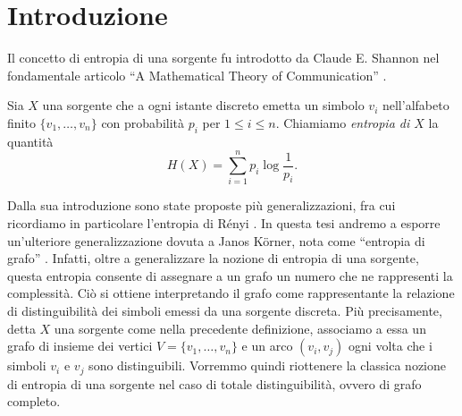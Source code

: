 \chapter{Introduzione} 
Il concetto di entropia di una sorgente fu introdotto da Claude E. Shannon nel fondamentale articolo ``A Mathematical Theory of Communication'' \cite{Shannon1948}.
\begin{definition}
  Sia \(X\) una sorgente che a ogni istante discreto emetta un simbolo \(v_i\) nell'alfabeto finito \(\{v_1,\dots,v_n\}\) con probabilità \(p_i\) per \(1\le i\le n\). Chiamiamo \emph{entropia di \(X\)} la quantità
  \[H(X)=\sum_{i=1}^n{p_i\log{\frac{1}{p_i}}}\text{.}\]
\end{definition}

Dalla sua introduzione sono state proposte più generalizzazioni, fra cui 
ricordiamo in particolare l'entropia di Rényi \cite{Renyi1961}. In questa tesi 
andremo a esporre un'ulteriore generalizzazione dovuta a Janos K\"orner, nota 
come ``entropia di grafo'' \cite{Korner1973}. Infatti, oltre a generalizzare 
la nozione di entropia di una sorgente, questa entropia consente di assegnare 
a un grafo un numero che ne rappresenti la complessità. Ciò si ottiene 
interpretando il grafo come rappresentante la relazione di distinguibilità dei 
simboli emessi da una sorgente discreta. Più precisamente, detta \(X\) una 
sorgente come nella precedente definizione, associamo a essa un grafo di 
insieme dei vertici \(V=\{v_1,\dots,v_n\}\) e un arco \((v_i,v_j)\) ogni volta 
che i simboli \(v_i\) e \(v_j\) sono distinguibili. Vorremmo quindi riottenere 
la classica nozione di entropia di una sorgente nel caso di totale 
distinguibilità, ovvero di grafo completo.

